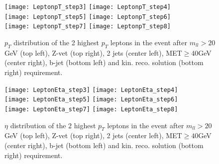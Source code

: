 


\begin{figure}
  \texttt{[image: LeptonpT\_step3]}
  \texttt{[image: LeptonpT\_step4]}\\
  \texttt{[image: LeptonpT\_step5]}
  \texttt{[image: LeptonpT\_step6]}\\
  \texttt{[image: LeptonpT\_step7]}
  \texttt{[image: LeptonpT\_step8]}
\caption{$p_T$ distribution of the 2 highest $p_T$ leptons in the event after $m_{ll}>20$ GeV (top left), Z-vet (top right), 2 jets (center left), MET$\geq40$GeV (center right), b-jet (bottom left) and kin. reco. solution (bottom right) requirement.}
\end{figure}

\clearpage
\newpage




\begin{figure}
  \texttt{[image: LeptonEta\_step3]}
  \texttt{[image: LeptonEta\_step4]}\\
  \texttt{[image: LeptonEta\_step5]}
  \texttt{[image: LeptonEta\_step6]}\\
  \texttt{[image: LeptonEta\_step7]}
  \texttt{[image: LeptonEta\_step8]}
\caption{$\eta$ distribution of the 2 highest $p_T$ leptons in the event after $m_{ll}>20$ GeV (top left), Z-vet (top right), 2 jets (center left), MET$\geq40$GeV (center right), b-jet (bottom left) and kin. reco. solution (bottom right) requirement.}
\end{figure}


